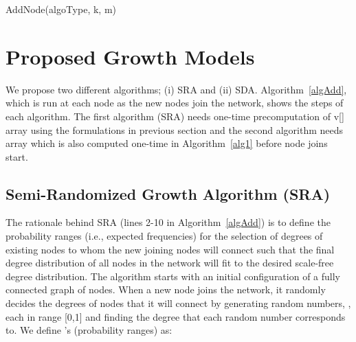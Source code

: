 \documentclass[10pt,journal,cspaper,compsoc]{IEEEtran}
\begin{document}
\begin{algorithm}
    \caption{AddNode(algoType, k, m)}
    \label{algAdd}
    \begin{algorithmic}[1]
    \STATE{Pick a random number  in [0,1)}
    \ENDWHILE
    \ENDIF
    \end{algorithmic}
\end{algorithm}


\section{Proposed Growth Models}
\label{sec:proposed}
We propose two different algorithms; (i) SRA and (ii) SDA. Algorithm~\ref{algAdd}, which is run at each node as the new nodes join the network, shows the steps of each algorithm. The first algorithm (SRA) needs one-time precomputation of v[] array using the formulations in previous section and the second algorithm needs  array which is also computed one-time in Algorithm~\ref{alg1} before node joins start.

\subsection{Semi-Randomized Growth Algorithm (SRA)}
The rationale behind SRA (lines 2-10 in Algorithm~\ref{algAdd}) is to define the probability ranges (i.e., expected frequencies) for the selection of degrees of existing nodes to whom the new joining nodes will connect such that the final degree distribution of all nodes in the network will fit to the desired scale-free degree distribution. The algorithm starts with an initial configuration of a fully connected graph of  nodes. When a new node joins the network, it randomly decides the degrees of nodes that it will connect by generating  random numbers, , each in range [0,1] and finding the degree that each random number corresponds to. We define 's (probability ranges) as:
\end{document}
